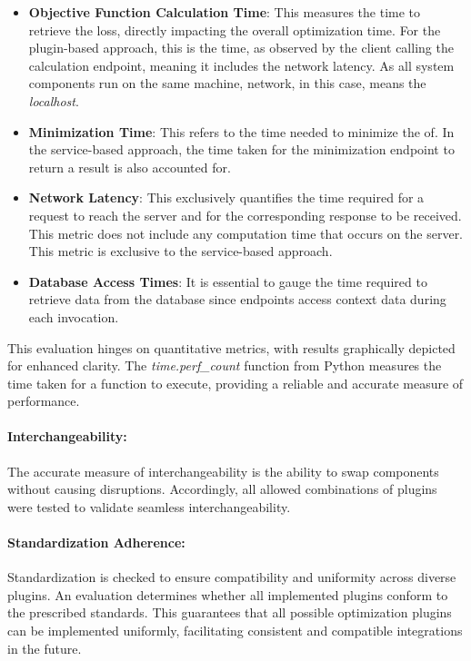 \documentclass[
  a4paper,  %
  twoside,  %
  bibliography=totoc,
  headsepline,
  cleardoublepage=empty,
  parskip=half,
  draft=false
]{scrbook}
\begin{document}
\begin{itemize}
\item \textbf{Objective Function Calculation Time}: This measures the time to retrieve the loss, directly impacting the overall optimization time.
For the plugin-based approach, this is the time, as observed by the client calling the calculation endpoint, meaning it includes the network latency.
As all system components run on the same machine, network, in this case, means the \emph{localhost}.

\item \textbf{Minimization Time}: This refers to the time needed to minimize the \gls{of}.
In the service-based approach, the time taken for the minimization endpoint to return a result is also accounted for.

\item \textbf{Network Latency}: This exclusively quantifies the time required for a request to reach the server and for the corresponding response to be received.
This metric does not include any computation time that occurs on the server.
This metric is exclusive to the service-based approach.

\item \textbf{Database Access Times}: It is essential to gauge the time required to retrieve data from the database since endpoints access context data during each invocation.
\end{itemize}

This evaluation hinges on quantitative metrics, with results graphically depicted for enhanced clarity.
The \emph{time.perf\_count} function from Python measures the time taken for a function to execute, providing a reliable and accurate measure of performance.

\paragraph{Interchangeability:}
The accurate measure of interchangeability is the ability to swap components without causing disruptions.
Accordingly, all allowed combinations of plugins were tested to validate seamless interchangeability.

\paragraph{Standardization Adherence:}
Standardization is checked to ensure compatibility and uniformity across diverse plugins.
An evaluation determines whether all implemented plugins conform to the prescribed standards.
This guarantees that all possible optimization plugins can be implemented uniformly, facilitating consistent and compatible integrations in the future.
\end{document}
